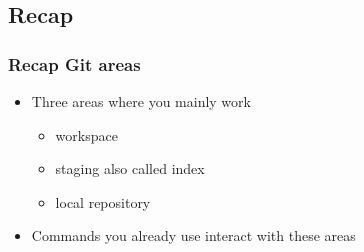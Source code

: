 \subsection{Recap}
\begin{frame}
    \frametitle{Recap Git areas}
    \begin{itemize}
        \item Three areas where you mainly work
            \begin{itemize}
                \item workspace
                \item staging also called index
                \item local repository
            \end{itemize}
        \item Commands you already use interact with these areas
    \end{itemize}
\end{frame}


